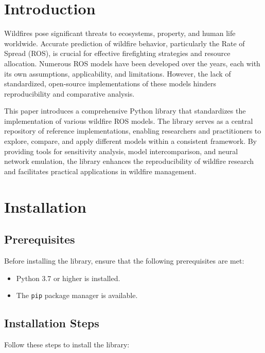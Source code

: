 \documentclass{article}
\begin{document}
	\section{Introduction}
	Wildfires pose significant threats to ecosystems, property, and human life worldwide. Accurate prediction of wildfire behavior, particularly the Rate of Spread (ROS), is crucial for effective firefighting strategies and resource allocation. Numerous ROS models have been developed over the years, each with its own assumptions, applicability, and limitations. However, the lack of standardized, open-source implementations of these models hinders reproducibility and comparative analysis.
	
	This paper introduces a comprehensive Python library that standardizes the implementation of various wildfire ROS models. The library serves as a central repository of reference implementations, enabling researchers and practitioners to explore, compare, and apply different models within a consistent framework. By providing tools for sensitivity analysis, model intercomparison, and neural network emulation, the library enhances the reproducibility of wildfire research and facilitates practical applications in wildfire management.
	
	\section{Installation}
	\subsection{Prerequisites}
	Before installing the library, ensure that the following prerequisites are met:
	\begin{itemize}
		\item Python 3.7 or higher is installed.
		\item The \texttt{pip} package manager is available.
	\end{itemize}
	
	\subsection{Installation Steps}
	Follow these steps to install the library:
	
\end{document}
